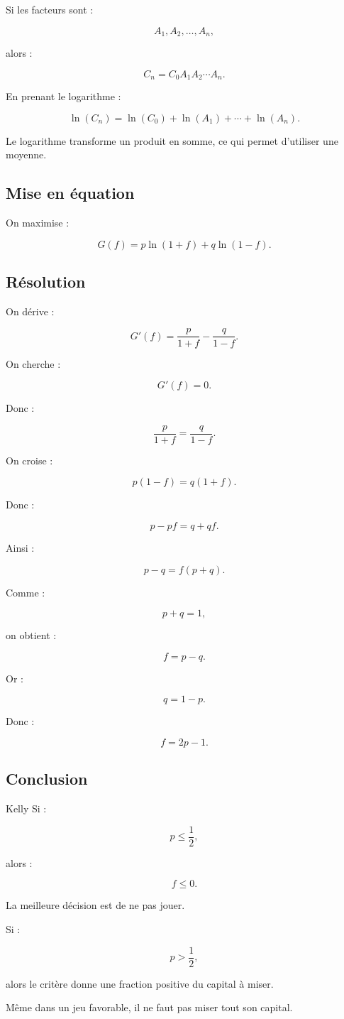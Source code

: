 \documentclass[11pt,a4paper]{article}
\begin{document}
Si les facteurs sont :

\[
A_1,A_2,\dots,A_n,
\]

alors :

\[
C_n=C_0A_1A_2\cdots A_n.
\]

En prenant le logarithme :

\[
\ln(C_n)=\ln(C_0)+\ln(A_1)+\cdots+\ln(A_n).
\]

Le logarithme transforme un produit en somme, ce qui permet d'utiliser une moyenne.

\subsection{Mise en équation}

On maximise :

\[
G(f)=p\ln(1+f)+q\ln(1-f).
\]

\subsection{Résolution}

On dérive :

\[
G'(f)=\frac{p}{1+f}-\frac{q}{1-f}.
\]

On cherche :

\[
G'(f)=0.
\]

Donc :

\[
\frac{p}{1+f}=\frac{q}{1-f}.
\]

On croise :

\[
p(1-f)=q(1+f).
\]

Donc :

\[
p-pf=q+qf.
\]

Ainsi :

\[
p-q=f(p+q).
\]

Comme :

\[
p+q=1,
\]

on obtient :

\[
f=p-q.
\]

Or :

\[
q=1-p.
\]

Donc :

\[
f=2p-1.
\]

\subsection{Conclusion}

\begin{conclusionbox}{Kelly}
Si :

\[
p\leq\frac12,
\]

alors :

\[
f\leq 0.
\]

La meilleure décision est de ne pas jouer.

Si :

\[
p>\frac12,
\]

alors le critère donne une fraction positive du capital à miser.

Même dans un jeu favorable, il ne faut pas miser tout son capital.
\end{conclusionbox}
\end{document}

